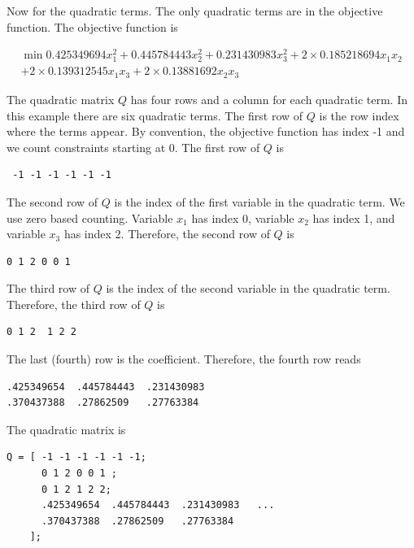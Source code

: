 \documentclass[11pt]{article}
\renewcommand{\_}{{\char"5F}}
\renewcommand{\{}{{\char"7B}}
\renewcommand{\}}{{\char"7D}}
\renewcommand{\^}{{\char"0D}}
\renewcommand{\'}{{\char"0D}}
\begin{document}
\begin{enumerate}[Step 1:]
Now for the quadratic terms. The only quadratic terms are in the objective function. The objective function is


\begin{eqnarray*}
\min  0.425349694 x_{1}^{2} +  0.445784443 x_{2}^{2} + 0.231430983 x_{3}^{2} + 2 \times 0.185218694 x_{1} x_{2} \\
+ 2 \times 0.139312545 x_{1} x_{3} + 2 \times 0.13881692 x_{2} x_{3}
\end{eqnarray*}


 The quadratic matrix $Q$ has four rows and a column for each quadratic term. In this example there are six quadratic terms.  The first row of $Q$ is the row index where the terms appear. By convention, the objective function has index -1 and we count constraints starting at 0.  The first row of $Q$ is


 \begin{verbatim}
 -1 -1 -1 -1 -1 -1
 \end{verbatim}

The second row of $Q$ is the index of the first variable in the quadratic term. We use zero based counting.  Variable $x_{1}$ has index 0, variable  $x_{2}$ has index 1, and variable $x_{3}$ has index 2.  Therefore, the second row of $Q$ is



\begin{verbatim}
0 1 2 0 0 1
\end{verbatim}



The third row of $Q$ is the index of the second variable in the quadratic term.   Therefore, the third row of $Q$ is



\begin{verbatim}
0 1 2  1 2 2
\end{verbatim}



The last (fourth) row is the coefficient. Therefore, the fourth row reads





\begin{verbatim}
.425349654  .445784443  .231430983
.370437388  .27862509   .27763384
\end{verbatim}


The quadratic matrix is



\begin{verbatim}
Q = [ -1 -1 -1 -1 -1 -1;
      0 1 2 0 0 1 ;
      0 1 2 1 2 2;
      .425349654  .445784443  .231430983   ...
      .370437388  .27862509   .27763384
    ];
\end{verbatim}



\end{enumerate}
\end{document}
